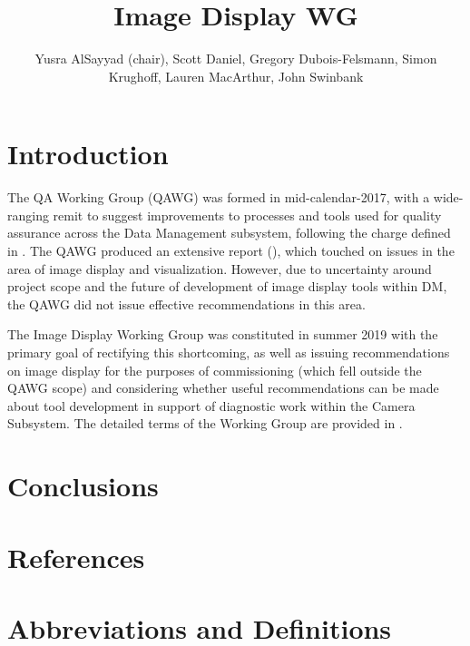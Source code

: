 \documentclass[DM,authoryear,toc]{lsstdoc}
\title{Image Display WG}
\author{%
Yusra AlSayyad (chair),
Scott Daniel,
Gregory Dubois-Felsmann,
Simon Krughoff,
Lauren MacArthur,
John Swinbank
}
\date{\vcsDate}
\begin{document}
\maketitle

\section{Introduction}

The QA Working Group (QAWG) was formed in mid-calendar-2017, with a wide-ranging remit to suggest improvements to processes and tools used for quality assurance across the Data Management subsystem, following the charge defined in .
The QAWG produced an extensive report (), which touched on issues in the area of image display and visualization.
However, due to uncertainty around project scope and the future of development of image display tools within DM, the QAWG did not issue effective recommendations in this area.

The Image Display Working Group was constituted in summer 2019 with the primary goal of rectifying this shortcoming, as well as issuing recommendations on image display for the purposes of commissioning (which fell outside the QAWG scope) and considering whether useful recommendations can be made about tool development in support of diagnostic work within the Camera Subsystem.
The detailed terms of the Working Group are provided in .

\section{Conclusions}

\appendix

\section{References}
\label{sec:bib}


\section{Abbreviations and Definitions}
\label{sec:acronyms}

\end{document}
